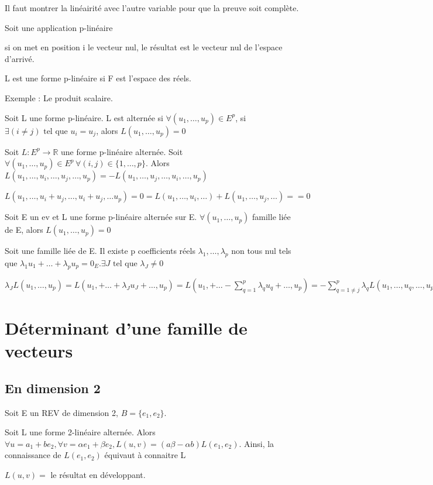 \documentclass[french]{yLectureNote}
\newcommand{\R}[0]{\mathbb{R}}
\newcommand{\tq}[0]{\text{ tel que }}
\begin{document}
Il faut montrer la linéairité avec l'autre variable pour que la preuve soit complète.
\begin{proposition}
Soit une application p-linéaire

si on met en position i le vecteur nul, le résultat est le vecteur nul de l'espace d'arrivé.
\end{proposition}
\begin{definition}
L est une forme p-linéaire si F est l'espace des réels.
\end{definition}
Exemple : Le produit scalaire.
\begin{definition}
Soit L une forme p-linéaire. L est alternée si \(\forall (u_1,\dots, u_p)\in E^p\), si \(\exists (i\neq j)\tq u_i = u_j\), alors \(L(u_1,\dots, u_p) = 0\)
\end{definition}
\begin{proposition}
Soit \(L : E^p \to \R\) une forme p-linéaire alternée. Soit \(\forall (u_1,\dots, u_p)\in E^p\, \forall (i,j)\in \{1,\dots, p\}\). Alors \(L(u_1,\dots, u_i,\dots, u_j,\dots, u_p) = - L(u_1,\dots, u_j,\dots, u_i,\dots, u_p)\)
\end{proposition}
\begin{myproof}
 \(L(u_1,\dots, u_i+u_j,\dots, u_i+u_j, \dots u_p) =0 = L(u_1,\dots, u_i,\dots)+L(u_1,\dots, u_j,\dots) = = 0 \)
\end{myproof}
\begin{proposition}
Soit E un ev et L une forme p-linéaire alternée sur E. \(\forall (u_1,\dots, u_p)\) famille liée de E, alors \(L(u_1,\dots, u_p) = 0\)
\end{proposition}
\begin{myproof}
 Soit une famille liée de E. Il existe p coefficients réels \(\lambda_1,\dots, \lambda_p\) non tous nul tels que \(\lambda_1u_1+\dots+\lambda_pu_p = 0_E. \exists J \tq \lambda_J \neq 0\)

 \(\lambda_J L(u_1,\dots, u_p) =  L(u_1,+\dots+\lambda_Ju_J+\dots, u_p) =  L(u_1,+\dots-\sum^p_{q=1}\lambda_qu_q+\dots, u_p) = -\sum^p_{q=1\neq j}\lambda_q L(u_1,\dots, u_q,\dots, u_p) = -\sum^p_{q=1\neq j} \lambda_q 0 = 0\)
\end{myproof}
\section{Déterminant d'une famille de vecteurs}
\subsection{En dimension 2}
Soit E un REV de dimension 2, \(B = \{e_1,e_2\}\).
\begin{proposition}
Soit L une forme 2-linéaire alternée. Alors \(\forall u = a_1+be_2,\forall v = \alpha e_1+\beta e_2, L(u,v) = (a\beta-\alpha b)L(e_1,e_2)\). Ainsi, la connaissance de \(L(e_1,e_2)\) équivaut à connaitre L
\end{proposition}
\begin{myproof}
 \(L(u,v) = \) le résultat en développant.
\end{myproof}
\end{document}
